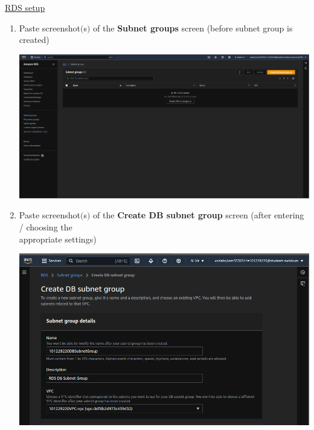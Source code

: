\documentclass[11pt]{article}
\begin{document}
\newpage
\noindent\underline{RDS setup}    
\begin{enumerate}[resume]
    \item Paste screenshot$($s$)$ of the \textbf{Subnet groups} screen (before subnet group is created) \\
    
    \vspace{2mm}

    {\centering
    \includegraphics[width=5.8in]{pics/23.png}
    }


    
    \item Paste screenshot$($s$)$ of the \textbf{Create DB subnet group} screen (after entering / choosing the \\ appropriate settings) \\
    \vspace{2mm}

    {\centering
    \includegraphics[width=5.8in]{pics/24a.png}
    }


\end{enumerate}
\end{document}
